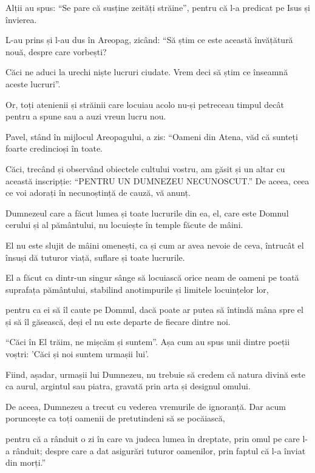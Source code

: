 {\par }{\PP Alții au spus: “Se pare că susține zeități străine”, pentru că l-a predicat pe Isus și învierea.


\par }{\PP {}L-au prins și l-au dus în Areopag, zicând: “Să știm ce este această învățătură nouă, despre care vorbești?

Căci ne aduci la urechi niște lucruri ciudate. Vrem deci să știm ce înseamnă aceste lucruri”.

Or, toți atenienii și străinii care locuiau acolo nu-și petreceau timpul decât pentru a spune sau a auzi vreun lucru nou.


\par }{\PP {}Pavel, stând în mijlocul Areopagului, a zis: “Oameni din Atena, văd că sunteți foarte credincioși în toate.

Căci, trecând și observând obiectele cultului vostru, am găsit și un altar cu această inscripție: “PENTRU UN DUMNEZEU NECUNOSCUT.” De aceea, ceea ce voi adorați în necunoștință de cauză, vă anunț.

Dumnezeul care a făcut lumea și toate lucrurile din ea, el, care este Domnul cerului și al pământului, nu locuiește în temple făcute de mâini.

El nu este slujit de mâini omenești, ca și cum ar avea nevoie de ceva, întrucât el însuși dă tuturor viață, suflare și toate lucrurile.

El a făcut ca dintr-un singur sânge să locuiască orice neam de oameni pe toată suprafața pământului, stabilind anotimpurile și limitele locuințelor lor,

pentru ca ei să îl caute pe Domnul, dacă poate ar putea să întindă mâna spre el și să îl găsească, deși el nu este departe de fiecare dintre noi.

“Căci în El trăim, ne mișcăm și suntem”. Așa cum au spus unii dintre poeții voștri: 'Căci și noi suntem urmașii lui'.

Fiind, așadar, urmașii lui Dumnezeu, nu trebuie să credem că natura divină este ca aurul, argintul sau piatra, gravată prin arta și designul omului.

De aceea, Dumnezeu a trecut cu vederea vremurile de ignoranță. Dar acum poruncește ca toți oamenii de pretutindeni să se pocăiască,

pentru că a rânduit o zi în care va judeca lumea în dreptate, prin omul pe care l-a rânduit; despre care a dat asigurări tuturor oamenilor, prin faptul că l-a înviat din morți.”


}
